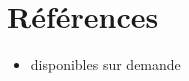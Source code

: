 \documentclass[11pt,a4paper,roman]{moderncv}        %
\begin{document}
%


\section{Références}
\vspace{6pt}
\begin{itemize}
\item{disponibles sur demande}
\end{itemize}
%


\end{document}
